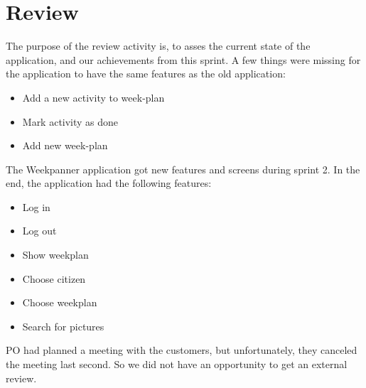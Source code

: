 \section{Review}

The purpose of the review activity is, to asses the current state of the application, and our achievements from this sprint. A few things were missing for the application to have the same features as the old application:

\begin{itemize}
    \item Add a new activity to week-plan
    \item Mark activity as done
    \item Add new week-plan
\end{itemize}

The Weekpanner application got new features and screens during sprint 2. In the end, the application had the following features:

\begin{itemize}
    \item Log in
    \item Log out
    \item Show weekplan 
    \item Choose citizen
    \item Choose weekplan
    \item Search for pictures
\end{itemize}

\gls{PO} had planned a meeting with the customers, but unfortunately, they canceled the meeting last second. So we did not have an opportunity to get an external review.

